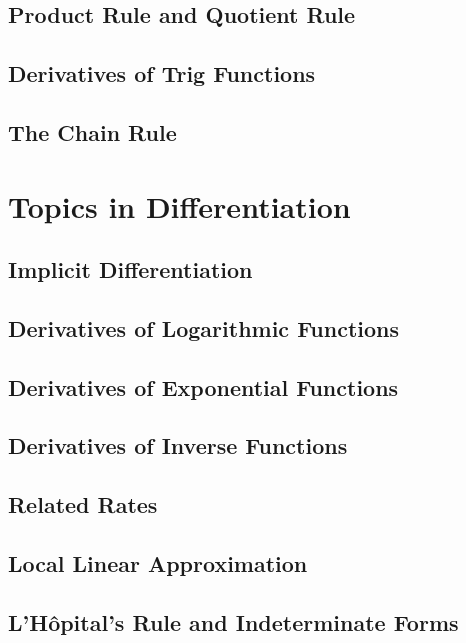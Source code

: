 \documentclass[letterpaper]{report}
\theoremstyle{definition}
\begin{document}
\section{Product Rule and Quotient Rule}

\section{Derivatives of Trig Functions}

\section{The Chain Rule}


\chapter{Topics in Differentiation}

\section{Implicit Differentiation}

\section{Derivatives of Logarithmic Functions}

\section{Derivatives of Exponential Functions}

\section{Derivatives of Inverse Functions}

\section{Related Rates}

\section{Local Linear Approximation}

\section{L'H\^{o}pital's Rule and Indeterminate Forms}
\end{document}
